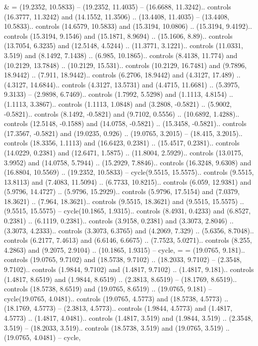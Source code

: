 {&} = {(19.2352, 10.5833) -- (19.2352, 11.4035) -- (16.6688, 11.3242).. controls (16.3777, 11.3242) and (14.1552, 11.3506) .. (13.4408, 11.4035) -- (13.4408, 10.5833).. controls (14.6579, 10.5833) and (15.3194, 10.0806) .. (15.3194, 9.4192).. controls (15.3194, 9.1546) and (15.1871, 8.9694) .. (15.1606, 8.89).. controls (13.7054, 6.3235) and (12.5148, 4.5244) .. (11.3771, 3.1221).. controls (11.0331, 3.519) and (8.1492, 7.1438) .. (6.985, 10.1865).. controls (8.4138, 11.774) and (10.2129, 13.7848) .. (10.2129, 15.531).. controls (10.2129, 16.7481) and (9.7896, 18.9442) .. (7.911, 18.9442).. controls (6.2706, 18.9442) and (4.3127, 17.489) .. (4.3127, 14.6844).. controls (4.3127, 13.5731) and (4.4715, 11.6681) .. (5.3975, 9.3133) -- (2.9898, 6.7469).. controls (1.7992, 5.5298) and (1.1113, 4.8154) .. (1.1113, 3.3867).. controls (1.1113, 1.0848) and (3.2808, -0.5821) .. (5.9002, -0.5821).. controls (8.1492, -0.5821) and (9.7102, 0.5556) .. (10.6892, 1.4288).. controls (12.5148, -0.1588) and (14.0758, -0.5821) .. (15.3458, -0.5821).. controls (17.3567, -0.5821) and (19.0235, 0.926) .. (19.0765, 3.2015) -- (18.415, 3.2015).. controls (18.3356, 1.1113) and (16.6423, 0.2381) .. (15.4517, 0.2381).. controls (14.0229, 0.2381) and (12.6471, 1.5875) .. (11.8004, 2.5929).. controls (13.0175, 3.9952) and (14.0758, 5.7944) .. (15.2929, 7.8846).. controls (16.3248, 9.6308) and (16.8804, 10.5569) .. (19.2352, 10.5833) -- cycle(9.5515, 15.5575).. controls (9.5515, 13.8113) and (7.4083, 11.5094) .. (6.7733, 10.8215).. controls (6.059, 12.9381) and (5.9796, 14.4727) .. (5.9796, 15.2929).. controls (5.9796, 17.5154) and (7.0379, 18.3621) .. (7.964, 18.3621).. controls (9.5515, 18.3621) and (9.5515, 15.5575) .. (9.5515, 15.5575) -- cycle(10.1865, 1.9315).. controls (8.4931, 0.4233) and (6.8527, 0.2381) .. (6.1119, 0.2381).. controls (3.9158, 0.2381) and (3.3073, 2.8046) .. (3.3073, 4.2333).. controls (3.3073, 6.3765) and (4.2069, 7.329) .. (5.6356, 8.7048).. controls (6.2177, 7.4613) and (6.6146, 6.6675) .. (7.7523, 5.0271).. controls (8.255, 4.2863) and (9.2075, 2.9104) .. (10.1865, 1.9315) -- cycle},
{=} = {(19.0765, 9.181).. controls (19.0765, 9.7102) and (18.5738, 9.7102) .. (18.2033, 9.7102) -- (2.3548, 9.7102).. controls (1.9844, 9.7102) and (1.4817, 9.7102) .. (1.4817, 9.181).. controls (1.4817, 8.6519) and (1.9844, 8.6519) .. (2.3813, 8.6519) -- (18.1769, 8.6519).. controls (18.5738, 8.6519) and (19.0765, 8.6519) .. (19.0765, 9.181) -- cycle(19.0765, 4.0481).. controls (19.0765, 4.5773) and (18.5738, 4.5773) .. (18.1769, 4.5773) -- (2.3813, 4.5773).. controls (1.9844, 4.5773) and (1.4817, 4.5773) .. (1.4817, 4.0481).. controls (1.4817, 3.519) and (1.9844, 3.519) .. (2.3548, 3.519) -- (18.2033, 3.519).. controls (18.5738, 3.519) and (19.0765, 3.519) .. (19.0765, 4.0481) -- cycle},
